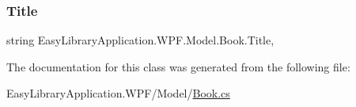 \subsubsection{\texorpdfstring{Title}{Title}}
{\footnotesize\ttfamily string Easy\+Library\+Application.\+W\+P\+F.\+Model.\+Book.\+Title\hspace{0.3cm}{\ttfamily [get]}, {\ttfamily [set]}}



The documentation for this class was generated from the following file\+:\begin{DoxyCompactItemize}
\item 
Easy\+Library\+Application.\+W\+P\+F/\+Model/\mbox{\hyperlink{_book_8cs}{Book.\+cs}}\end{DoxyCompactItemize}
